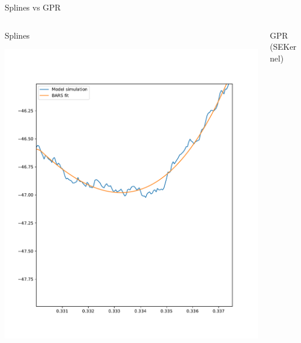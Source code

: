 \documentclass[presentation]{beamer}
\begin{document}
\begin{frame}[plain,label={sec:org8dbeab2}]{Splines vs GPR}
\begin{columns}
\begin{column}{0.5\columnwidth}
\begin{center}
Splines
\end{center}

\begin{center}
\includegraphics[width=1.1\textwidth]{./BARS2.pdf}
\end{center}    
\end{column}


\begin{column}{0.5\columnwidth}
\begin{center}
GPR (SEKernel)
\end{center}


\end{column}
\end{columns}
\end{frame}
\end{document}
